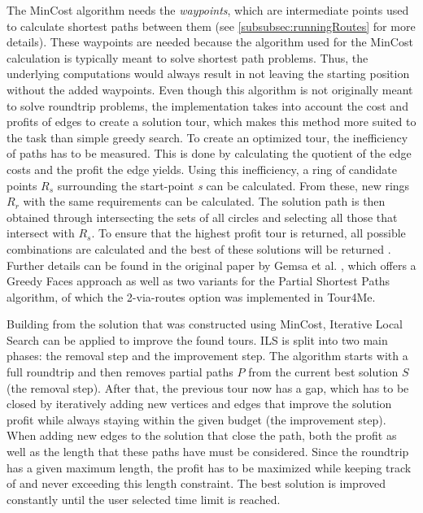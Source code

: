 The MinCost algorithm \cite{buchin_tour4me_2022, gemsa_efficient_2013} needs the \textit{waypoints}, which are intermediate points used to calculate shortest paths between them (see \ref{subsubsec:runningRoutes} for more details).
These waypoints are needed because the algorithm used for the MinCost calculation is typically meant to solve shortest path problems. 
Thus, the underlying computations would always result in not leaving the starting position without the added waypoints. 
Even though this algorithm is not originally meant to solve roundtrip problems, the implementation takes into account the cost and profits of edges to create a solution tour, which makes this method more suited to the task than simple greedy search.
To create an optimized tour, the inefficiency of paths has to be measured. 
This is done by calculating the quotient of the edge costs and the profit the edge yields. 
Using this inefficiency, a ring of candidate points $R_s$ surrounding the start-point \textit{s} can be calculated.
From these, new rings $R_r$ with the same requirements can be calculated. 
The solution path is then obtained through intersecting the sets of all circles and selecting all those that intersect with $R_s$.
To ensure that the highest profit tour is returned, all possible combinations are calculated and the best of these solutions will be returned \cite{buchin_tour4me_2022}. 
Further details can be found in the original paper by Gemsa et al. \cite{gemsa_efficient_2013}, which offers a Greedy Faces approach as well as two variants for the Partial Shortest Paths algorithm, of which the 2-via-routes option was implemented in Tour4Me.

Building from the solution that was constructed using MinCost, Iterative Local Search \cite{buchin_tour4me_2022, lu_arc_2015, verbeeck_extension_2014} can be applied to improve the found tours.
ILS is split into two main phases: the removal step and the improvement step.
The algorithm starts with a full roundtrip and then removes partial paths $P$ from the current best solution $S$ (the removal step).
After that, the previous tour now has a gap, which has to be closed by iteratively adding new vertices and edges that improve the solution profit while always staying within the given budget (the improvement step).
When adding new edges to the solution that close the path, both the profit as well as the length that these paths have must be considered. 
Since the roundtrip has a given maximum length, the profit has to be maximized while keeping track of and never exceeding this length constraint.
The best solution is improved constantly until the user selected time limit is reached.

